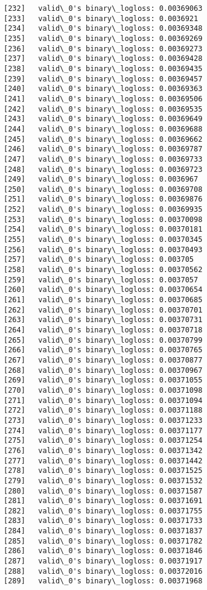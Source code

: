 \documentclass[11pt]{article}
\begin{document}
\begin{Verbatim}[commandchars=\\\{\}]
[232]	valid\_0's binary\_logloss: 0.00369063
[233]	valid\_0's binary\_logloss: 0.0036921
[234]	valid\_0's binary\_logloss: 0.00369348
[235]	valid\_0's binary\_logloss: 0.00369269
[236]	valid\_0's binary\_logloss: 0.00369273
[237]	valid\_0's binary\_logloss: 0.00369428
[238]	valid\_0's binary\_logloss: 0.00369435
[239]	valid\_0's binary\_logloss: 0.00369457
[240]	valid\_0's binary\_logloss: 0.00369363
[241]	valid\_0's binary\_logloss: 0.00369506
[242]	valid\_0's binary\_logloss: 0.00369535
[243]	valid\_0's binary\_logloss: 0.00369649
[244]	valid\_0's binary\_logloss: 0.00369688
[245]	valid\_0's binary\_logloss: 0.00369662
[246]	valid\_0's binary\_logloss: 0.00369787
[247]	valid\_0's binary\_logloss: 0.00369733
[248]	valid\_0's binary\_logloss: 0.00369723
[249]	valid\_0's binary\_logloss: 0.0036967
[250]	valid\_0's binary\_logloss: 0.00369708
[251]	valid\_0's binary\_logloss: 0.00369876
[252]	valid\_0's binary\_logloss: 0.00369935
[253]	valid\_0's binary\_logloss: 0.00370098
[254]	valid\_0's binary\_logloss: 0.00370181
[255]	valid\_0's binary\_logloss: 0.00370345
[256]	valid\_0's binary\_logloss: 0.00370493
[257]	valid\_0's binary\_logloss: 0.003705
[258]	valid\_0's binary\_logloss: 0.00370562
[259]	valid\_0's binary\_logloss: 0.0037057
[260]	valid\_0's binary\_logloss: 0.00370654
[261]	valid\_0's binary\_logloss: 0.00370685
[262]	valid\_0's binary\_logloss: 0.00370701
[263]	valid\_0's binary\_logloss: 0.00370731
[264]	valid\_0's binary\_logloss: 0.00370718
[265]	valid\_0's binary\_logloss: 0.00370799
[266]	valid\_0's binary\_logloss: 0.00370765
[267]	valid\_0's binary\_logloss: 0.00370877
[268]	valid\_0's binary\_logloss: 0.00370967
[269]	valid\_0's binary\_logloss: 0.00371055
[270]	valid\_0's binary\_logloss: 0.00371098
[271]	valid\_0's binary\_logloss: 0.00371094
[272]	valid\_0's binary\_logloss: 0.00371188
[273]	valid\_0's binary\_logloss: 0.00371233
[274]	valid\_0's binary\_logloss: 0.00371177
[275]	valid\_0's binary\_logloss: 0.00371254
[276]	valid\_0's binary\_logloss: 0.00371342
[277]	valid\_0's binary\_logloss: 0.00371442
[278]	valid\_0's binary\_logloss: 0.00371525
[279]	valid\_0's binary\_logloss: 0.00371532
[280]	valid\_0's binary\_logloss: 0.00371587
[281]	valid\_0's binary\_logloss: 0.00371691
[282]	valid\_0's binary\_logloss: 0.00371755
[283]	valid\_0's binary\_logloss: 0.00371733
[284]	valid\_0's binary\_logloss: 0.00371837
[285]	valid\_0's binary\_logloss: 0.00371782
[286]	valid\_0's binary\_logloss: 0.00371846
[287]	valid\_0's binary\_logloss: 0.00371917
[288]	valid\_0's binary\_logloss: 0.00372016
[289]	valid\_0's binary\_logloss: 0.00371968

\end{Verbatim}
\end{document}
